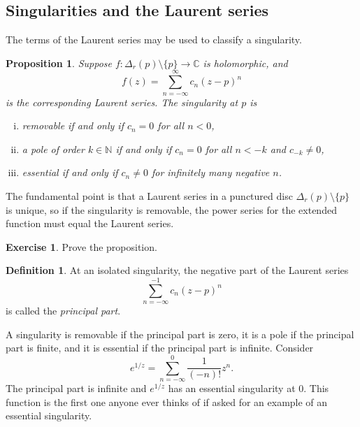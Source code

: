 \documentclass[12pt,openany]{book}
\newcommand{\C}{{\mathbb{C}}}
\newcommand{\N}{{\mathbb{N}}}
\newcommand{\myindex}[1]{#1\index{#1}}
\theoremstyle{plain}
\newtheorem{prop}[thm]{Proposition}
\theoremstyle{remark}
\theoremstyle{definition}
\newtheorem{defn}[thm]{Definition}
\newenvironment{exbox}{%
    \def\FrameCommand{\vrule width 1pt \relax\hspace{10pt}}%
    \MakeFramed{\advance\hsize-\width\FrameRestore}%
}{%
    \endMakeFramed
}
\theoremstyle{exercise}
\newtheorem{exercise}{Exercise}[section]
\theoremstyle{example}
\begin{document}
\subsection{Singularities and the Laurent series}

The terms of the Laurent series may be used to 
classify a singularity.

\begin{prop}
Suppose $f \colon \Delta_r(p) \setminus \{p\} \to \C$ is holomorphic,
and
\begin{equation*}
f(z) = \sum_{n=-\infty}^\infty c_n {(z-p)}^n
\end{equation*}
is the corresponding Laurent series.
The singularity at $p$ is
\begin{enumerate}[(i)]
\item \emph{removable} if and only if $c_n = 0$ for all $n < 0$,
\item a \emph{pole} of order $k \in \N$ if and only if $c_n = 0$ for all $n < -k$ and
$c_{-k}
\not= 0$,
\item \emph{essential} if and only if $c_n \not= 0$ for infinitely many negative $n$.
\end{enumerate}
\end{prop}

The fundamental point is that a Laurent series in a punctured
disc $\Delta_r(p) \setminus \{p\}$ is unique,
so if the singularity is removable, the power
series for the extended function must equal the Laurent series.

\begin{exbox}
\begin{exercise}
Prove the proposition.
\end{exercise}
\end{exbox}

\begin{defn} \label{defn:principalpart}
At an isolated singularity, the negative part of the Laurent series
\begin{equation*}
\sum_{n=-\infty}^{-1} c_n {(z-p)}^n 
\end{equation*}
is called the \emph{\myindex{principal part}}.
\end{defn}

A singularity is
removable if the principal part is zero, it is a pole if the principal part
is finite, and it is essential if the principal part is infinite.
Consider
\begin{equation*}
e^{1/z}
=
\sum_{n=-\infty}^0 \frac{1}{(-n)!} z^n .
\end{equation*}
The principal part is infinite and $e^{1/z}$ has an essential
singularity at $0$.  This function is the first one anyone ever thinks of
if asked for an example of an essential singularity.
\end{document}
